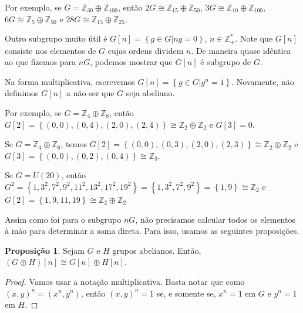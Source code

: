 \documentclass[a4paper,portuguese,11pt,twoside, leqno]{book}
\theoremstyle{definition}
\newtheorem{prop}{Proposição}[section]
\begin{document}
	\par\vspace{0.3cm} Por exemplo, se $G = \mathbb{Z}_{30}\oplus\mathbb{Z}_{100}$, então $2G \cong \mathbb{Z}_{15}\oplus\mathbb{Z}_{50}$, $3G \cong \mathbb{Z}_{10}\oplus\mathbb{Z}_{100}$, $6G \cong \mathbb{Z}_5\oplus\mathbb{Z}_{50}$ e $28G \cong \mathbb{Z}_{15}\oplus\mathbb{Z}_{25}$.
	\par\vspace{0.3cm} Outro subgrupo muito útil é $G[n] = \left\{ g\in G\vert ng=0 \right\}$, $n\in\mathbb{Z}_+^\ast$. Note que $G[n]$ consiste nos elementos de $G$ cujas ordens dividem $n$. De maneira quase idêntica ao que fizemos para $nG$, podemos mostrar que $G[n]$ é subgrupo de $G$.
	\par\vspace{0.3cm} Na forma multiplicativa, escrevemos $G[n] = \left\{ g\in G\vert g^n=1 \right\}$. Novamente, não definimos $G[n]$ a não ser que $G$ seja abeliano. 
	\par\vspace{0.3cm} Por exemplo, se $G = \mathbb{Z}_4\oplus\mathbb{Z}_8$, então $G[2] = \left\{ (0,0), (0,4), (2,0), (2,4) \right\}\cong\mathbb{Z}_2\oplus\mathbb{Z}_2$ e $G[3] = 0$. 
	\par\vspace{0.3cm} Se $G = \mathbb{Z}_4\oplus\mathbb{Z}_6$, temos $G[2] = \left\{ (0,0), (0,3), (2,0), (2,3) \right\}\cong \mathbb{Z}_2\oplus\mathbb{Z}_2$ e $G[3] = \left\{ (0,0), (0,2), (0,4) \right\}\cong\mathbb{Z}_3$.
	\par\vspace{0.3cm} Se $G = U(20)$, então $G^2 = \left\{ 1, 3^2, 7^2, 9^2, 11^2, 13^2, 17^2, 19^2 \right\} = \left\{ 1, 3^2, 7^2, 9^2 \right\} = \left\{ 1, 9 \right\}\cong\mathbb{Z}_2$ e $G[2] = \left\{ 1,9,11,19 \right\}\cong\mathbb{Z}_2\oplus\mathbb{Z}_2$
	\par\vspace{0.3cm} Assim como foi para o subgrupo $nG$, não precisamos calcular todos os elementos à mão para determinar a soma direta. Para isso, usamos as seguintes proposições.
	
	\begin{prop}
		\label{subgrupo abeliano G[n]}
		Sejam $G$ e $H$ grupos abelianos. Então, $(G\oplus H)[n] \cong G[n]\oplus H[n]$.
	\end{prop}
	\begin{proof}
		Vamos usar a notação multiplicativa. Basta notar que como $(x,y)^n = (x^n, y^n)$, então $(x,y)^n = 1$ se, e somente se, $x^n = 1$ em $G$ e $y^n = 1$ em $H$. 
	\end{proof}
	
\end{document}
